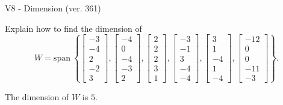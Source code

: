 \begin{exercise}
  \begin{exerciseTitle}V8 - Dimension (ver. 361)\end{exerciseTitle}
  \begin{exerciseStatement}
    Explain how to find the dimension of 
\[W=\mathrm{span}\ \left\{\left[\begin{array}{r}
-3 \\
-4 \\
2 \\
-2 \\
3
\end{array}\right] , \left[\begin{array}{r}
-4 \\
0 \\
-4 \\
-3 \\
2
\end{array}\right] , \left[\begin{array}{r}
2 \\
2 \\
2 \\
3 \\
1
\end{array}\right] , \left[\begin{array}{r}
-3 \\
-1 \\
3 \\
-4 \\
-4
\end{array}\right] , \left[\begin{array}{r}
3 \\
1 \\
-4 \\
1 \\
-4
\end{array}\right] , \left[\begin{array}{r}
-12 \\
0 \\
0 \\
-11 \\
-3
\end{array}\right]\right\}.\]



  \end{exerciseStatement}
  \begin{exerciseAnswer}
   The dimension of \(W\) is  \(5\).
  


  \end{exerciseAnswer}
\end{exercise}